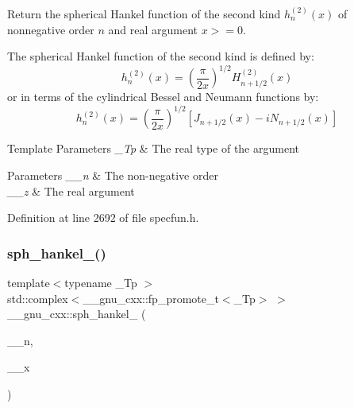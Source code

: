 Return the spherical Hankel function of the second kind $ h^{(2)}_n(x)$ of nonnegative order $ n $ and real argument $ x >= 0 $.

The spherical Hankel function of the second kind is defined by\+: \[ h^{(2)}_n(x) = \left(\frac{\pi}{2x} \right) ^{1/2} H^{(2)}_{n+1/2}(x) \] or in terms of the cylindrical Bessel and Neumann functions by\+: \[ h^{(2)}_n(x) = \left(\frac{\pi}{2x} \right) ^{1/2} \left[ J_{n+1/2}(x) - iN_{n+1/2}(x) \right] \]


\begin{DoxyTemplParams}{Template Parameters}
{\em \+\_\+\+Tp} & The real type of the argument \\
\hline
\end{DoxyTemplParams}

\begin{DoxyParams}{Parameters}
{\em \+\_\+\+\_\+n} & The non-\/negative order \\
\hline
{\em \+\_\+\+\_\+z} & The real argument \\
\hline
\end{DoxyParams}


Definition at line 2692 of file specfun.\+h.

\mbox{\label{group__gnu__math__spec__func_ga0e7d9b5a93ab1d1040040f0ef44590de}} 
\subsubsection{\texorpdfstring{sph\+\_\+hankel\+\_()}{sph\_hankel\_2()}\hspace{0.1cm}{\footnotesize\ttfamily [2/2]}}
{\footnotesize\ttfamily template$<$typename \+\_\+\+Tp $>$ \\
std\+::complex$<$\+\_\+\+\_\+gnu\+\_\+cxx\+::fp\+\_\+promote\+\_\+t$<$\+\_\+\+Tp$>$ $>$ \+\_\+\+\_\+gnu\+\_\+cxx\+::sph\+\_\+hankel\+\_ (\begin{DoxyParamCaption}\item[{unsigned int}]{\+\_\+\+\_\+n,  }\item[{std\+::complex$<$ \+\_\+\+Tp $>$}]{\+\_\+\+\_\+x }\end{DoxyParamCaption})\hspace{0.3cm}{\ttfamily [inline]}}

